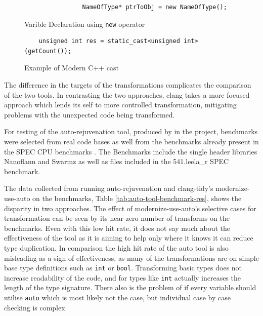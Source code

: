 \documentclass[bsc,frontabs,singlespacing,twoside,parskip,deptreport]{infthesis}
\begin{document}
\begin{figure}[H]
    \begin{verbatim}
                NameOfType* ptrToObj = new NameOfType(); 
    \end{verbatim}
    \caption{Varible Declaration using \texttt{new} operator}
    \centering
    \label{fig:code-new-vardec}
\end{figure}

\begin{figure}[H]
    \begin{verbatim}
    unsigned int res = static_cast<unsigned int>(getCount());
    \end{verbatim}
    \caption{Example of Modern C++ cast}
    \centering
    \label{fig:code-modern-cast}
\end{figure}

The difference in the targets of the transformations complicates the comparison of the two tools. In contrasting the two approaches, clang takes a more focused approach which lends its self to more controlled transformation,  mitigating problems with the unexpected code being transformed.

For testing of the auto-rejuvenation tool, produced by in the project, benchmarks were selected from real code bases as well from the benchmarks already present in the SPEC CPU benchmarks \cite{SPEC}. The Benchmarks include the single header libraries Nanoflann \cite{blanco2014nanoflann} and Swarmz \cite{SWARMZ} as well as files included in the 541.leela\_r \cite{SPEC_LEELA} SPEC benchmark.

 
The data collected from running auto-rejuvenation and clang-tidy's modernize-use-auto on the benchmarks, Table \ref{tab:auto-tool-benchmark-res}, shows the disparity in two approaches. The effect of modernize-use-auto's selective cases for transformation can be seen by its near-zero number of transforms on the benchmarks. Even with this low hit rate, it does not say much about the effectiveness of the tool as it is aiming to help only where it knows it can reduce type duplication. In comparison the high hit rate of the auto tool is also misleading as a sign of effectiveness, as many of the transformations are on simple base type definitions such as \texttt{int} or \texttt{bool}. Transforming basic types does not increase readability of the code, and for types like \texttt{int} actually increases the length of the type signature. There also is the problem of if every variable should utilise \texttt{auto} which is most likely not the case, but individual case by case checking is complex.   
\end{document}
